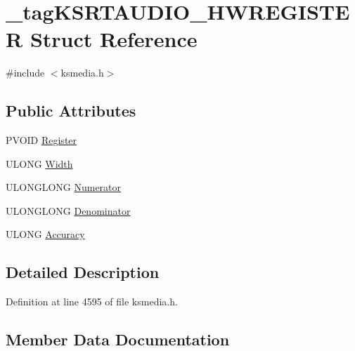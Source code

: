 \hypertarget{struct__tag_k_s_r_t_a_u_d_i_o___h_w_r_e_g_i_s_t_e_r}{}\section{\+\_\+tag\+K\+S\+R\+T\+A\+U\+D\+I\+O\+\_\+\+H\+W\+R\+E\+G\+I\+S\+T\+ER Struct Reference}
\label{struct__tag_k_s_r_t_a_u_d_i_o___h_w_r_e_g_i_s_t_e_r}


{\ttfamily \#include $<$ksmedia.\+h$>$}

\subsection*{Public Attributes}
\begin{DoxyCompactItemize}
\item 
P\+V\+O\+ID \hyperlink{struct__tag_k_s_r_t_a_u_d_i_o___h_w_r_e_g_i_s_t_e_r_aedadadf95f257c1804bbf7d21d66a22e}{Register}
\item 
U\+L\+O\+NG \hyperlink{struct__tag_k_s_r_t_a_u_d_i_o___h_w_r_e_g_i_s_t_e_r_a8aac8b12c07467c7733c881f403de474}{Width}
\item 
U\+L\+O\+N\+G\+L\+O\+NG \hyperlink{struct__tag_k_s_r_t_a_u_d_i_o___h_w_r_e_g_i_s_t_e_r_a36d6a57f957b5efc35bc255ae5c1310c}{Numerator}
\item 
U\+L\+O\+N\+G\+L\+O\+NG \hyperlink{struct__tag_k_s_r_t_a_u_d_i_o___h_w_r_e_g_i_s_t_e_r_ad5e16088b37f44824b86350f71f1da85}{Denominator}
\item 
U\+L\+O\+NG \hyperlink{struct__tag_k_s_r_t_a_u_d_i_o___h_w_r_e_g_i_s_t_e_r_a30aa2b744c744bb00f94bc7de2867937}{Accuracy}
\end{DoxyCompactItemize}


\subsection{Detailed Description}


Definition at line 4595 of file ksmedia.\+h.



\subsection{Member Data Documentation}
